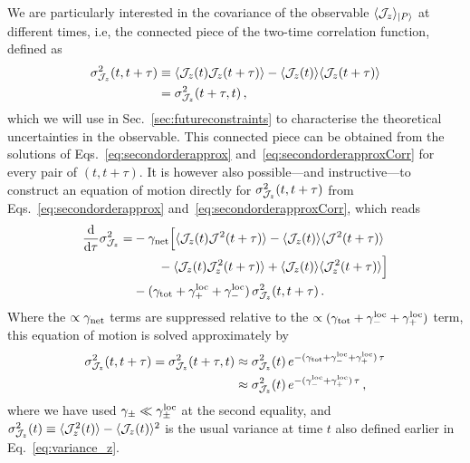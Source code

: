 \documentclass[aps,prd,10pt,twocolumn,superscriptaddress,floatfix,nofootinbib,amsmath,amssymb,altaffilletter,preprintnumbers]{revtex4-1}
\begin{document}
We are particularly interested in the covariance of the observable $\langle {\cal J}_z \rangle_{|P\rangle}$ at different times, i.e, the connected piece of the two-time correlation function, defined as
\begin{equation}
\begin{aligned}
\sigma^2_{{\cal J}_z}(t,t+\tau) \equiv\; & \langle {\cal J}_z(t) {\cal J}_z(t+\tau) \rangle - \langle {\cal J}_z(t) \rangle \langle {\cal J}_z(t+\tau) \rangle \\
= \; & \sigma^2_{{\cal J}_z}(t+\tau,t) \, ,
\label{eq:connected_piece}
\end{aligned}
\end{equation}
which we will use in Sec.~\ref{sec:futureconstraints} to characterise the theoretical uncertainties in the observable.  This connected piece can be obtained from the solutions of Eqs.~\eqref{eq:secondorderapprox} and~\eqref{eq:secondorderapproxCorr} for every pair of $(t, t+\tau)$.  It is however also possible---and instructive---to construct an equation of motion directly for $\sigma^2_{{\cal J}_z}(t,t+\tau)$ from Eqs.~\eqref{eq:secondorderapprox} and~\eqref{eq:secondorderapproxCorr}, which reads
\begin{equation}
\begin{aligned}
\frac{{\rm d}}{{\rm d} \tau} \sigma^2_{{\cal J}_z} = & - \gamma_{\rm net} \Big[\langle {\cal J}_z(t) {\cal J}^2(t+\tau)\rangle - \langle {\cal J}_z(t) \rangle \langle {\cal J}^2(t+\tau) \rangle \\
& \qquad -\langle {\cal J}_z(t) {\cal J}_z^2(t+\tau)\rangle + \langle {\cal J}_z(t) \rangle \langle {\cal J}_z^2(t+\tau) \rangle \Big]\\
& -(\gamma_{\rm tot} + \gamma_+^{\rm loc}+\gamma_-^{\rm loc} ) \, \sigma^2_{{\cal J}_z} (t,t+\tau)\, .\label{eq:mom_sigma22}
\end{aligned}
\end{equation}
Where the $\propto \gamma_{\rm net}$ terms are suppressed relative to the $\propto (\gamma_{\rm tot}+\gamma_-^{\rm loc}  +\gamma_+^{\rm loc})$ term, this equation of motion is solved approximately by
\begin{equation}
\begin{aligned}
\sigma^2_{{\cal J}_z} (t,t+\tau) = \sigma^2_{{\cal J}_z} (t+\tau,t) \approx \; & \sigma^2_{{\cal J}_z}(t)\, e^{-(\gamma_{\rm tot} + \gamma_-^{\rm loc} +\gamma_+^{\rm loc})\, \tau}   \\
\approx \; & \sigma^2_{{\cal J}_z}(t)\, e^{-(\gamma_-^{\rm loc}+\gamma_+^{\rm loc})\, \tau}\, ,
\label{eq:sigma2off}
\end{aligned}
\end{equation}
where we have used $\gamma_\pm \ll \gamma_\pm^{\rm loc}$ at the second equality, and 
$\sigma^2_{{\cal J}_z}(t)\equiv \langle {\cal J}_z^2 (t) \rangle -\langle {\cal J}_z(t) \rangle^2$ is the usual variance at time $t$ also defined earlier in Eq.~\eqref{eq:variance_z}. 
\end{document}
